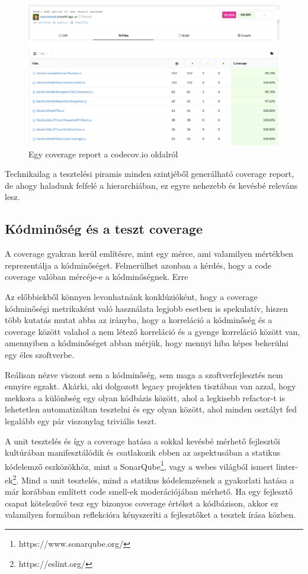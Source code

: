\begin{figure}[H]
    \centering
    \includegraphics[width=1\textwidth]{images/codecov-report.png}
    \caption{Egy coverage report a codecov.io oldalról}
    \label{fig:codecov-example}
\end{figure}

Technikailag a tesztelési piramis minden szintjéből generálható coverage report, de ahogy haladunk felfelé a hierarchiában, ez egyre nehezebb és kevésbé releváns lesz.

\subsection{Kódminőség és a teszt coverage}

A coverage gyakran kerül említésre, mint egy mérce, ami valamilyen mértékben reprezentálja a kódminőséget. Felmerülhet azonban a kérdés, hogy a code coverage valóban mércéje-e a kódminőségnek. Erre

Az előbbiekből könnyen levonhatnánk konklúzióként, hogy a coverage kódminőségi metrikaként való használata legjobb esetben is spekulatív, hiszen több kutatás mutat abba az irányba, hogy a korreláció a kódminőség és a coverage között valahol a nem létező korreláció és a gyenge korreláció között van, amennyiben a kódminőséget abban mérjük, hogy mennyi hiba képes bekerülni egy éles szoftverbe.

Reálisan nézve viszont sem a kódminőség, sem maga a szoftverfejlesztés nem ennyire egzakt. Akárki, aki dolgozott legacy projekten tisztában van azzal, hogy mekkora a különbség egy olyan kódbázis között, ahol a legkisebb refactor-t is lehetetlen automatizáltan tesztelni és egy olyan között, ahol minden osztályt fed legalább egy pár viszonylag triviális teszt.

A unit tesztelés és így a coverage hatása a sokkal kevésbé mérhető fejlesztői kultúrában manifesztálódik és csatlakozik ebben az aspektusában a statikus kódelemző eszközökhöz, mint a SonarQube\footnote{https://www.sonarqube.org/}, vagy a webes világból ismert linter-ek\footnote{https://eslint.org/}. Mind a unit tesztelés, mind a statikus kódelemzésnek a gyakorlati hatása a már korábban említett code smell-ek moderációjában mérhető. Ha egy fejlesztő csapat kötelezővé tesz egy bizonyos coverage értéket a kódbázison, akkor ez valamilyen formában reflekcióra kényszeríti a fejlesztőket a tesztek írása közben.

